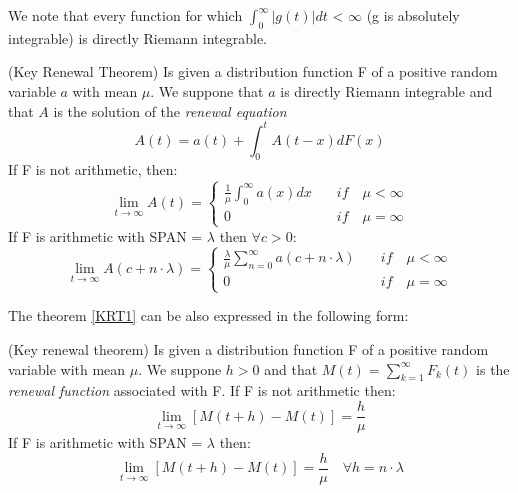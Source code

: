 We note that every function for which $\int_{0}^{\infty} |g(t)| dt$ < $\infty$ (g is absolutely integrable) is directly Riemann integrable.

\begin{theorem}
	(Key Renewal Theorem) Is given a distribution function F of a positive random variable $a$ with mean $\mu$. We suppone that $a$ is directly Riemann integrable and that $A$ is the solution of the \textit{renewal equation}
	\begin{equation}
		A(t)=a(t)+\int_{0}^{t}A(t-x)dF(x)
	\end{equation}
	If F is not arithmetic, then:
	\begin{equation*}
		\lim_{t \rightarrow \infty} A(t) =
		\begin{cases}
			\frac{1}{\mu} \int_{0}^{\infty}a(x)dx \quad & if \quad \mu < \infty
			\\
			0 \quad & if \quad \mu = \infty
		\end{cases}
	\end{equation*}
	If F is arithmetic with SPAN = $\lambda$ then $\forall c > 0$:
	\begin{equation*}
		\lim_{t \rightarrow \infty} A(c+n\cdot \lambda) =
		\begin{cases}
			\frac{\lambda}{\mu} \sum_{n=0}^{\infty}a(c+n \cdot \lambda) \quad & if 	\quad \mu<\infty
			\\
			0 \quad & if \quad \mu = \infty
		\end{cases}
	\end{equation*}
\label{KRT1}
\end{theorem}

The theorem \ref{KRT1} can be also expressed in the following form:

\begin{theorem}
	(Key renewal theorem) Is given a distribution function F of a positive random variable with mean $\mu$. We suppone $h>0$ and that $M(t)=\sum_{k=1}^\infty F_{k}(t)$ is the \textit{renewal function} associated with F.
	If F is not arithmetic then:
	\begin{equation}
		\lim_{t \rightarrow \infty} [M(t+h)-M(t)]=\frac{h}{\mu}
	\end{equation}
	If F is arithmetic with SPAN = $\lambda$ then:
	\begin{equation}
		\lim_{t \rightarrow \infty} [M(t+h)-M(t)]=\frac{h}{\mu} \quad \forall h = n \cdot \lambda
	\end{equation}
	\label{KRT2}
\end{theorem}

